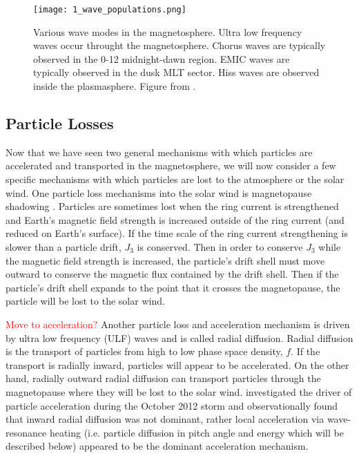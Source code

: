 \begin{figure}
\texttt{[image: 1\_wave\_populations.png]}
\caption{Various wave modes in the magnetosphere. Ultra low frequency waves occur throught the magnetosphere. Chorus waves are typically observed in the 0-12 midnight-dawn region. EMIC waves are typically observed in the dusk MLT sector. Hiss waves are observed inside the plasmasphere. Figure from \citet{Millan2007}.}
\label{Intro:waves}
\end{figure}

\subsection{Particle Losses}\label{Intro:losses}
Now that we have seen two general mechanisms with which particles are accelerated and transported in the magnetosphere, we will now consider a few specific mechanisms with which particles are lost to the atmosphere or the solar wind. One particle loss mechanisms into the solar wind is magnetopause shadowing \citep[e.g.][]{Ukhorskiy2006}. Particles are sometimes lost when the ring current is strengthened and Earth's magnetic field strength is increased outside of the ring current (and reduced on Earth's surface). If the time scale of the ring current strengthening is slower than a particle drift, $J_3$ is conserved. Then in order to conserve $J_3$ while the magnetic field strength is increased, the particle's drift shell must move outward to conserve the magnetic flux contained by the drift shell. Then if the particle's drift shell expands to the point that it crosses the magnetopause, the particle will be lost to the solar wind.

\textcolor{red}{Move to acceleration?}
Another particle loss and acceleration mechanism is driven by ultra low frequency (ULF) waves and is called radial diffusion. Radial diffusion is the transport of particles from high to low phase space density, $f$. If the transport is radially inward, particles will appear to be accelerated. On the other hand, radially outward radial diffusion can transport particles through the magnetopause where they will be lost to the solar wind. \citet{Reeves2013} investigated the driver of particle acceleration during the October 2012 storm and observationally found that inward radial diffusion was not dominant, rather local acceleration via wave-resonance heating (i.e. particle diffusion in pitch angle and energy which will be described below) appeared to be the dominant acceleration mechanism.

